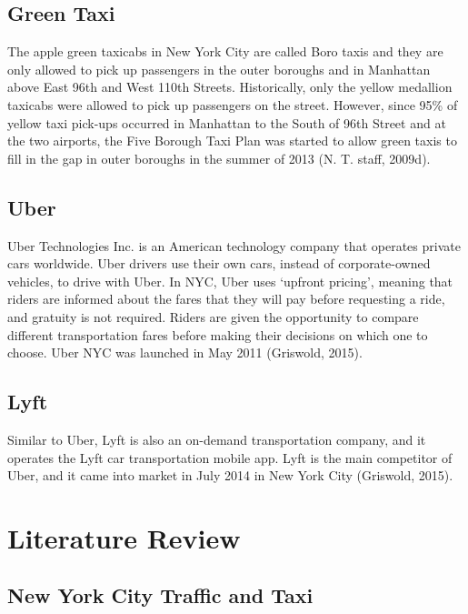 \documentclass[12pt,twoside]{reedthesis}
\theoremstyle{definition}
\theoremstyle{definition}
\theoremstyle{definition}
\theoremstyle{remark}
\begin{document}
\subsection{Green Taxi}\label{green-taxi}

The apple green taxicabs in New York City are called Boro taxis and they
are only allowed to pick up passengers in the outer boroughs and in
Manhattan above East 96th and West 110th Streets. Historically, only the
yellow medallion taxicabs were allowed to pick up passengers on the
street. However, since 95\% of yellow taxi pick-ups occurred in
Manhattan to the South of 96th Street and at the two airports, the Five
Borough Taxi Plan was started to allow green taxis to fill in the gap in
outer boroughs in the summer of 2013 (N. T. staff, 2009d).

\subsection{Uber}\label{uber}

Uber Technologies Inc. is an American technology company that operates
private cars worldwide. Uber drivers use their own cars, instead of
corporate-owned vehicles, to drive with Uber. In NYC, Uber uses `upfront
pricing', meaning that riders are informed about the fares that they
will pay before requesting a ride, and gratuity is not required. Riders
are given the opportunity to compare different transportation fares
before making their decisions on which one to choose. Uber NYC was
launched in May 2011 (Griswold, 2015).

\subsection{Lyft}\label{lyft}

Similar to Uber, Lyft is also an on-demand transportation company, and
it operates the Lyft car transportation mobile app. Lyft is the main
competitor of Uber, and it came into market in July 2014 in New York
City (Griswold, 2015).

\section{Literature Review}\label{literature-review}

\subsection{New York City Traffic and
Taxi}\label{new-york-city-traffic-and-taxi}
\end{document}
